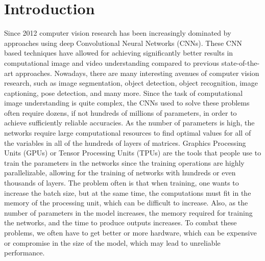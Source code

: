 \chapter{Introduction}
Since 2012 computer vision research has been increasingly dominated by approaches using deep Convolutional Neural Networks (CNNs). These CNN based techniques have allowed for achieving significantly better results in computational image and video understanding compared to previous state-of-the-art approaches. Nowadays, there are many interesting avenues of computer vision research, such as image segmentation, object detection, object recognition, image captioning, pose detection, and many more. Since the task of computational image understanding is quite complex, the CNNs used to solve these problems often require dozens, if not hundreds of millions of parameters, in order to achieve sufficiently reliable accuracies. As the number of parameters is high, the networks require large computational resources to find optimal values for all of the variables in all of the hundreds of layers of matrices. Graphics Processing Units (GPUs) or Tensor Processing Units (TPUs) are the tools that people use to train the parameters in the networks since the training operations are highly parallelizable, allowing for the training of networks with hundreds or even thousands of layers. The problem often is that when training, one wants to increase the batch size, but at the same time, the computations must fit in the memory of the processing unit, which can be difficult to increase. Also, as the number of parameters in the model increases, the memory required for training the networks, and the time to produce outputs increases. To combat these problems, we often have to get better or more hardware, which can be expensive or compromise in the size of the model, which may lead to unreliable performance.


